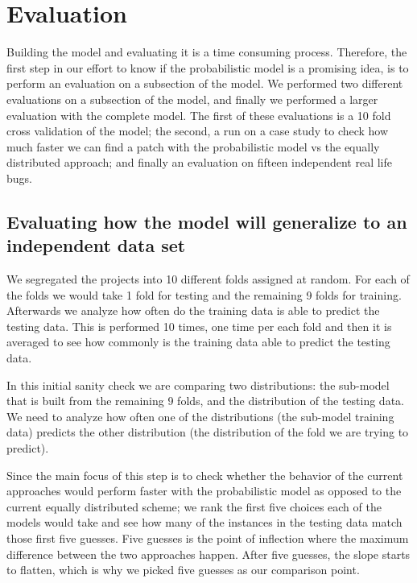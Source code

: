 \documentclass[conference]{IEEEtran}
\begin{document}
\section{Evaluation} \label{evaluation}
Building the model and evaluating it is a time consuming process. Therefore, the first step in our effort to know if the probabilistic model is a promising idea, is to perform an evaluation on a subsection of the model. We performed two different evaluations on a subsection of the model, and finally we performed a larger evaluation with the complete model. The first of these evaluations is a 10 fold cross 
validation of the model; the second, a run on a case study to check how 
much faster we can find a patch with the probabilistic model vs the equally 
distributed approach; and finally an evaluation on fifteen independent real life bugs.

\subsection{Evaluating how the model will generalize to an independent data set}

We segregated the projects into 10 
different folds assigned at random. For each of the 
folds we would take 1 fold for testing and the remaining 9 folds for training. 
Afterwards we analyze how often do the training data is able to predict the 
testing data. This is performed 10 times, one time per each fold and then it is 
averaged to see how commonly is the training data able to predict the testing 
data.

In this initial sanity check we are comparing two distributions: the sub-model 
that is built from the remaining 9 folds, and the distribution of the testing 
data. We need to analyze how often one of the distributions (the sub-model 
training data) predicts the other distribution (the distribution of the fold we 
are trying to predict). 

Since the main focus of this step is to check whether the behavior of the 
current approaches would perform faster with the probabilistic model as opposed 
to the current equally distributed scheme; we rank the first five choices each 
of the models would take and see how many of the instances in the testing data 
match those first five guesses. Five guesses is the point of inflection where the maximum difference between the two approaches happen. After five guesses, the slope starts to flatten, which is why we picked five guesses as our comparison point.
\end{document}
